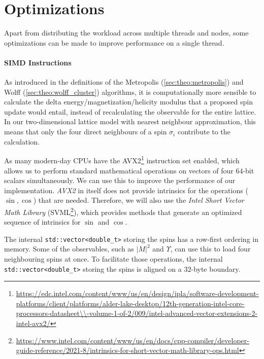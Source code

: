 \section{Optimizations}\label{sec:impl:optimizations}
	Apart from distributing the workload across multiple threads and nodes, some optimizations can be made to improve performance on a single thread.
	
	\paragraph{SIMD Instructions}\label{sec:impl:optimizations:simd}
		As introduced in the definitions of the Metropolis (\cref{sec:theo:metropolis}) and Wolff (\cref{sec:theo:wolff_cluster}) algorithms, it is computationally more sensible to calculate the delta energy/magnetization/helicity modulus that a proposed spin update would entail, instead of recalculating the observable for the entire lattice. In our two-dimensional lattice model with nearest neighbour approximation, this means that only the four direct neighbours of a spin $\sigma_i$ contribute to the calculation.
			
		As many modern-day CPUs have the AVX2\footnote{\url{https://edc.intel.com/content/www/us/en/design/ipla/software-development-platforms/client/platforms/alder-lake-desktop/12th-generation-intel-core-processors-datasheet\\-volume-1-of-2/009/intel-advanced-vector-extensions-2-intel-avx2/}} instruction set enabled, which allows us to perform standard mathematical operations on vectors of four $64$-bit scalars simultaneously. We can use this to improve the performance of our implementation. \emph{AVX2} in itself does not provide intrinsics for the operations ($\sin, \cos$) that are needed. Therefore, we will also use the \emph{Intel\textsuperscript{\tiny\textregistered} Short Vector Math Library} (SVML\footnote{\url{https://www.intel.com/content/www/us/en/docs/cpp-compiler/developer-guide-reference/2021-8/intrinsics-for-short-vector-math-library-ops.html}}), which provides methods that generate an optimized sequence of intrinsics for $\sin$ and $\cos$.
		
		The internal \texttt{std::vector<double_t>} storing the spins has a row-first ordering in memory. Some of the observables, such as $\lvert M \rvert^2$ and $\Upsilon$, can use this to load four neighbouring spins at once. To facilitate those operations, the internal \texttt{std::vector<double_t>} storing the spins is aligned on a $32$-byte boundary.
		
